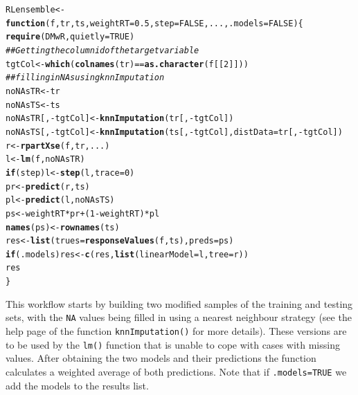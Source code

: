 \documentclass[10pt,a4paper]{article}\usepackage[]{graphicx}\usepackage[]{color}
\makeatletter
\newcommand{\hlnum}[1]{\textcolor[rgb]{0.686,0.059,0.569}{#1}}%
\newcommand{\hlcom}[1]{\textcolor[rgb]{0.678,0.584,0.686}{\textit{#1}}}%
\newcommand{\hlopt}[1]{\textcolor[rgb]{0,0,0}{#1}}%
\newcommand{\hlstd}[1]{\textcolor[rgb]{0.345,0.345,0.345}{#1}}%
\newcommand{\hlkwa}[1]{\textcolor[rgb]{0.161,0.373,0.58}{\textbf{#1}}}%
\newcommand{\hlkwb}[1]{\textcolor[rgb]{0.69,0.353,0.396}{#1}}%
\newcommand{\hlkwc}[1]{\textcolor[rgb]{0.333,0.667,0.333}{#1}}%
\newcommand{\hlkwd}[1]{\textcolor[rgb]{0.737,0.353,0.396}{\textbf{#1}}}%
\newenvironment{kframe}{%
 \def\at@end@of@kframe{}%
 \ifinner\ifhmode%
  \def\at@end@of@kframe{\end{minipage}}%
  \begin{minipage}{\columnwidth}%
 \fi\fi%
 \def\FrameCommand##1{\hskip\@totalleftmargin \hskip-\fboxsep
 \colorbox{shadecolor}{##1}\hskip-\fboxsep
     \hskip-\linewidth \hskip-\@totalleftmargin \hskip\columnwidth}%
 \MakeFramed {\advance\hsize-\width
   \@totalleftmargin\z@ \linewidth\hsize
   \@setminipage}}%
 {\par\unskip\endMakeFramed%
 \at@end@of@kframe}
\newenvironment{knitrout}{}{} %
\makeatother
\begin{document}
\begin{knitrout}\footnotesize
{}\color{fgcolor}\begin{kframe}
\begin{alltt}
\hlstd{RLensemble} \hlkwb{<-} \hlkwa{function}\hlstd{(}\hlkwc{f}\hlstd{,} \hlkwc{tr}\hlstd{,} \hlkwc{ts}\hlstd{,} \hlkwc{weightRT}\hlstd{=}\hlnum{0.5}\hlstd{,} \hlkwc{step}\hlstd{=}\hlnum{FALSE}\hlstd{,} \hlkwc{...}\hlstd{,} \hlkwc{.models}\hlstd{=}\hlnum{FALSE}\hlstd{) \{}
  \hlkwd{require}\hlstd{(DMwR,}\hlkwc{quietly}\hlstd{=}\hlnum{TRUE}\hlstd{)}
  \hlcom{## Getting the column id of the target variable}
  \hlstd{tgtCol} \hlkwb{<-} \hlkwd{which}\hlstd{(}\hlkwd{colnames}\hlstd{(tr)} \hlopt{==} \hlkwd{as.character}\hlstd{(f[[}\hlnum{2}\hlstd{]]))}
  \hlcom{## filling in NAs using knnImputation}
  \hlstd{noNAsTR} \hlkwb{<-} \hlstd{tr}
  \hlstd{noNAsTS} \hlkwb{<-} \hlstd{ts}
  \hlstd{noNAsTR[,}\hlopt{-}\hlstd{tgtCol]} \hlkwb{<-} \hlkwd{knnImputation}\hlstd{(tr[,}\hlopt{-}\hlstd{tgtCol])}
  \hlstd{noNAsTS[,}\hlopt{-}\hlstd{tgtCol]} \hlkwb{<-} \hlkwd{knnImputation}\hlstd{(ts[,}\hlopt{-}\hlstd{tgtCol],}\hlkwc{distData}\hlstd{=tr[,}\hlopt{-}\hlstd{tgtCol])}
  \hlstd{r} \hlkwb{<-} \hlkwd{rpartXse}\hlstd{(f,tr,...)}
  \hlstd{l} \hlkwb{<-} \hlkwd{lm}\hlstd{(f,noNAsTR)}
  \hlkwa{if} \hlstd{(step) l} \hlkwb{<-} \hlkwd{step}\hlstd{(l,}\hlkwc{trace}\hlstd{=}\hlnum{0}\hlstd{)}
  \hlstd{pr} \hlkwb{<-} \hlkwd{predict}\hlstd{(r,ts)}
  \hlstd{pl} \hlkwb{<-} \hlkwd{predict}\hlstd{(l,noNAsTS)}
  \hlstd{ps} \hlkwb{<-} \hlstd{weightRT}\hlopt{*}\hlstd{pr}\hlopt{+}\hlstd{(}\hlnum{1}\hlopt{-}\hlstd{weightRT)}\hlopt{*}\hlstd{pl}
  \hlkwd{names}\hlstd{(ps)} \hlkwb{<-} \hlkwd{rownames}\hlstd{(ts)}
  \hlstd{res} \hlkwb{<-} \hlkwd{list}\hlstd{(}\hlkwc{trues}\hlstd{=}\hlkwd{responseValues}\hlstd{(f,ts),}\hlkwc{preds}\hlstd{=ps)}
  \hlkwa{if} \hlstd{(.models) res} \hlkwb{<-} \hlkwd{c}\hlstd{(res,}\hlkwd{list}\hlstd{(}\hlkwc{linearModel}\hlstd{=l,}\hlkwc{tree}\hlstd{=r))}
  \hlstd{res}
\hlstd{\}}
\end{alltt}
\end{kframe}
\end{knitrout}

This workflow starts by building two modified samples of the training
and testing sets, with the \texttt{NA} values being filled in using a
nearest neighbour strategy (see the help page of the function
\texttt{knnImputation()} for more
details). These versions are to be used by the \texttt{lm()} function
that is unable to cope with cases with missing values. After obtaining
the two models and their predictions the function calculates a
weighted average of both predictions. Note that if \texttt{.models=TRUE} we add the models to the results list.
\end{document}
